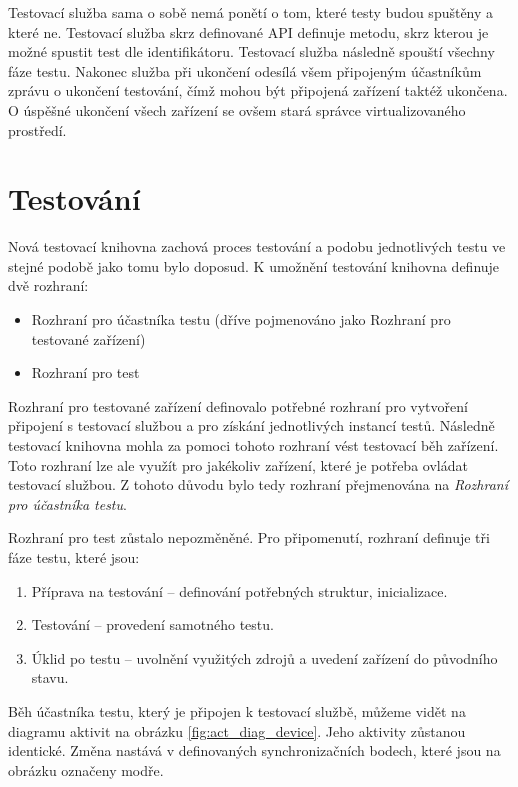 Testovací služba sama o sobě nemá ponětí o tom, které testy budou spuštěny a které ne. Testovací služba skrz definované API definuje metodu, skrz kterou je možné spustit test dle identifikátoru. Testovací služba následně spouští všechny fáze testu. Nakonec služba při ukončení odesílá všem připojeným účastníkům zprávu o ukončení testování, čímž mohou být připojená zařízení taktéž ukončena. O úspěšné ukončení všech zařízení se ovšem stará správce virtualizovaného prostředí.


\section{Testování}

Nová testovací knihovna zachová proces testování a podobu jednotlivých testu ve stejné podobě jako tomu bylo doposud. K umožnění testování knihovna definuje dvě rozhraní:

\begin{itemize}
    \item Rozhraní pro účastníka testu (dříve pojmenováno jako Rozhraní pro testované zařízení)
    \item Rozhraní pro test 
\end{itemize}

Rozhraní pro testované zařízení definovalo potřebné rozhraní pro vytvoření připojení s testovací službou a pro získání jednotlivých instancí testů. Následně testovací knihovna mohla za pomoci tohoto rozhraní vést testovací běh zařízení. Toto rozhraní lze ale využít pro jakékoliv zařízení, které je potřeba ovládat testovací službou. Z tohoto důvodu bylo tedy rozhraní přejmenována na \textit{Rozhraní pro účastníka testu}. 

Rozhraní pro test zůstalo nepozměněné. Pro připomenutí, rozhraní definuje tři fáze testu, které jsou:

\begin{enumerate}
    \item Příprava na testování -- definování potřebných struktur, inicializace.
    \item Testování -- provedení samotného testu.
    \item Úklid po testu -- uvolnění využitých zdrojů a uvedení zařízení do původního stavu.
\end{enumerate}

Běh účastníka testu, který je připojen k testovací službě, můžeme vidět na diagramu aktivit na obrázku \ref{fig:act_diag_device}. Jeho aktivity zůstanou identické. Změna nastává v definovaných synchronizačních bodech, které jsou na obrázku označeny modře. 

